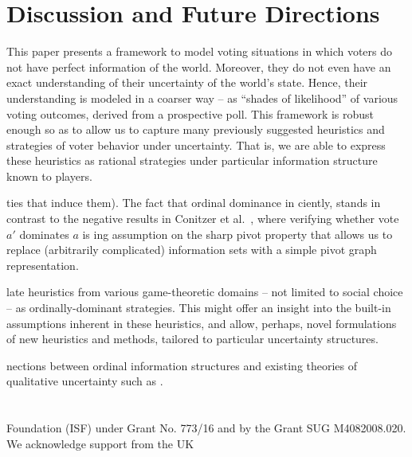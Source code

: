 \documentclass[letterpaper]{article} %
\begin{document}
\section{Discussion and Future Directions}

This paper presents a framework to model voting situations in which voters do not have perfect information of the world. Moreover, they do not even have an exact understanding of their uncertainty of the world's state. Hence, their understanding is modeled in a coarser way -- as ``shades of likelihood'' of various voting outcomes, derived from a prospective poll. This framework is robust enough so as to allow us to capture many previously suggested heuristics and strategies of voter behavior under uncertainty. That is, we are able to express these heuristics as rational strategies under particular information structure known to players.

   ties that induce them).
 The fact that ordinal dominance in ciently, stands in contrast to the negative results in Conitzer et al.~, where verifying whether vote $a'$ dominates $a$ is ing assumption on the sharp pivot property that allows us to replace (arbitrarily complicated) information sets with a simple pivot graph representation.

late heuristics from various game-theoretic domains -- not limited to social choice -- as ordinally-dominant strategies. This might offer an insight into the built-in assumptions inherent in these heuristics, and allow, perhaps, novel formulations of new heuristics and methods, tailored to particular uncertainty structures.

nections between ordinal information structures and existing theories of qualitative uncertainty such as \cite{Hal97}.

\section*{}

 Foundation (ISF) under Grant No. 773/16 and by the Grant SUG  M4082008.020. We acknowledge support from the UK  




\clearpage

\end{document}
